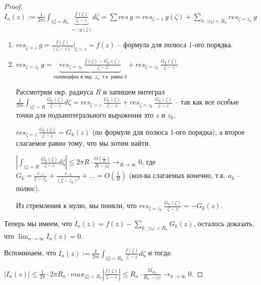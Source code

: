 \begin{proof}
    $I_n(z) := \frac{1}{2\pi i}\int_{|\zeta| = R_n} {\underbrace{\frac{f(\zeta)}{\zeta - z}}_{=: g(\zeta)} d\zeta} = \sum res \ g = res_{\zeta = z} \ g(\zeta) + \sum_{k : \ |z_k| < R_n} res_{\zeta = z_k} \ g$

    \begin{enumerate}
        \item {
            $res_{\zeta = z} \ g = \frac{f(\zeta)}{(\zeta - z)'}|_{\zeta = z} = f(z)$ -- формула для полюса $1$-ого порядка.
        }
        \item {
            $res_{\zeta = z_k} \ g = \underbrace{res_{\zeta = z_k} \ \frac{f(\zeta) - G_k(\zeta)}{\zeta - z}}_{\text{голоморфна в окр. $z_k$, т.е. равна $0$}} + res_{\zeta = z_k} \ \frac{G_k(\zeta)}{\zeta - z}$

            Рассмотрим окр. радиуса $R$ и запишем интеграл $\frac{1}{2 \pi i} \int_{|\zeta| = R} {\frac{G_k(\zeta)}{\zeta - z} d\zeta} = res_{\zeta = z} \ \frac{G_k(\zeta)}{\zeta - z} + res_{\zeta = z_k} \ \frac{G_k(\zeta)}{\zeta - z}$ -- так как все особые точки для подъинтегрального выражения это $z$ и $z_k$.


            $res_{\zeta = z} \ \frac{G_k(\zeta)}{\zeta - z} = G_k(z)$ (по формуле для полюса 1-ого порядка), а второе слагаемое равно тому, что мы хотим найти.

            $\left| \int_{|\zeta| = R} {\frac{G_k(\zeta)}{\zeta - z} d\zeta} \right| \leq 2\pi R \cdot \frac{O\left(\frac{1}{R}\right)}{R - |z|} \rightarrow_{R \to \infty} 0$, где $G_k = \frac{c_{-1}}{\zeta - z_k} + \frac{c_{-2}}{(\zeta - z_k)^2} + \ldots = O(\frac{1}{R})$ (кол-ва слагаемых конечно, т.к. $a_k$ -- полюс).

            Из стремления к нулю, мы поняли, что $res_{\zeta = z_k} \ \frac{G_k(\zeta)}{\zeta - z} = -G_k(z)$.
        }
    \end{enumerate}


    Теперь мы имеем, что $I_n(z) = f(z) - \sum_{k: \ |z_k| < R_n} G_k(z)$, осталось доказать, что $\lim_{n \rightarrow \infty} I_n(z) = 0$.

    Вспоминаем, что  $I_n(z) := \frac{1}{2\pi i}\int_{|\zeta| = R_n} {\frac{f(\zeta)}{\zeta - z} d\zeta}$ и тогда:

    $\left| I_n(z) \right| \leq \frac{1}{2 \pi} \cdot 2\pi R_n \cdot max_{|\zeta| = R_n} \left| \frac{f(\zeta)}{\zeta - z} \right| \leq R_n \cdot \frac{M_{R_n}}{R_n - |z|} \rightarrow_{n \to \infty} 0$.



\end{proof}
